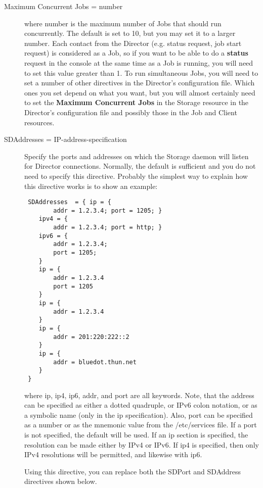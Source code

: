 \begin{description}
\item [Maximum Concurrent Jobs = \lt{}number\gt{}]
   where \lt{}number\gt{} is the maximum number of Jobs that should run
   concurrently.  The default is set to 10, but you may set it to a larger
   number.  Each contact from the Director (e.g.  status request, job start
   request) is considered as a Job, so if you want to be able to do a {\bf
   status} request in the console at the same time as a Job is running, you
   will need to set this value greater than 1.  To run simultaneous Jobs,
   you will need to set a number of other directives in the Director's
   configuration file.  Which ones you set depend on what you want, but you
   will almost certainly need to set the {\bf Maximum Concurrent Jobs} in
   the Storage resource in the Director's configuration file and possibly
   those in the Job and Client resources.

\item [SDAddresses = \lt{}IP-address-specification\gt{}]
   Specify the ports and addresses on which the Storage daemon will listen
   for Director connections.  Normally, the default is sufficient and you
   do not need to specify this directive.  Probably the simplest way to
   explain how this directive works is to show an example:

\footnotesize
\begin{verbatim}
 SDAddresses  = { ip = {
        addr = 1.2.3.4; port = 1205; }
    ipv4 = {
        addr = 1.2.3.4; port = http; }
    ipv6 = {
        addr = 1.2.3.4;
        port = 1205;
    }
    ip = {
        addr = 1.2.3.4
        port = 1205
    }
    ip = {
        addr = 1.2.3.4
    }
    ip = {
        addr = 201:220:222::2
    }
    ip = {
        addr = bluedot.thun.net
    }
 }
\end{verbatim}
\normalsize

where ip, ip4, ip6, addr, and port are all keywords. Note, that  the address
can be specified as either a dotted quadruple, or  IPv6 colon notation, or as
a symbolic name (only in the ip specification).  Also, port can be specified
as a number or as the mnemonic value from  the /etc/services file.  If a port
is not specified, the default will be used. If an ip  section is specified,
the resolution can be made either by IPv4 or  IPv6. If ip4 is specified, then
only IPv4 resolutions will be permitted,  and likewise with ip6.  

Using this directive, you can replace both the SDPort and SDAddress 
directives shown below. 


\end{description}
